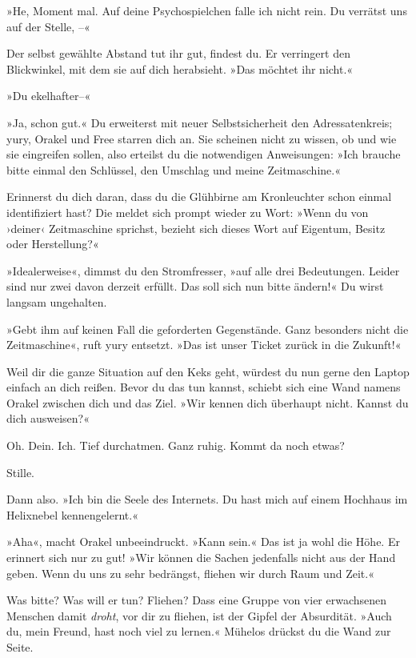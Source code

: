 »He, Moment mal. Auf deine Psychospielchen falle ich nicht rein. Du verrätst uns auf der Stelle, –«

Der selbst gewählte Abstand tut ihr gut, findest du. Er verringert den Blickwinkel, mit dem sie auf dich herabsieht. »Das möchtet ihr nicht.«

»Du ekelhafter–«

»Ja, schon gut.« Du erweiterst mit neuer Selbstsicherheit den Adressatenkreis; yury, Orakel und Free starren dich an. Sie scheinen nicht zu wissen, ob und wie sie eingreifen sollen, also erteilst du die notwendigen Anweisungen: »Ich brauche bitte einmal den Schlüssel, den Umschlag und meine Zeitmaschine.«

Erinnerst du dich daran, dass du die Glühbirne am Kronleuchter schon einmal identifiziert hast? Die meldet sich prompt wieder zu Wort: »Wenn du von ›deiner‹ Zeitmaschine sprichst, bezieht sich dieses Wort auf Eigentum, Besitz oder Herstellung?«

»Idealerweise«, dimmst du den Stromfresser, »auf alle drei Bedeutungen. Leider sind nur zwei davon derzeit erfüllt. Das soll sich nun bitte ändern!« Du wirst langsam ungehalten.

»Gebt ihm auf keinen Fall die geforderten Gegenstände. Ganz besonders nicht die Zeitmaschine«, ruft yury entsetzt. »Das ist unser Ticket zurück in die Zukunft!«

Weil dir die ganze Situation auf den Keks geht, würdest du nun gerne den Laptop einfach an dich reißen. Bevor du das tun kannst, schiebt sich eine Wand namens Orakel zwischen dich und das Ziel. »Wir kennen dich überhaupt nicht. Kannst du dich ausweisen?«

Oh. Dein. Ich. Tief durchatmen. Ganz ruhig. Kommt da noch etwas?

Stille.

Dann also. »Ich bin die Seele des Internets. Du hast mich auf einem Hochhaus im Helixnebel kennengelernt.« 

»Aha«, macht Orakel unbeeindruckt. »Kann sein.« Das ist ja wohl die Höhe. Er erinnert sich nur zu gut! »Wir können die Sachen jedenfalls nicht aus der Hand geben. Wenn du uns zu sehr bedrängst, fliehen wir durch Raum und Zeit.«

Was bitte? Was will er tun? Fliehen? Dass eine Gruppe von vier erwachsenen Menschen damit \emph{droht}, vor dir zu fliehen, ist der Gipfel der Absurdität. »Auch du, mein Freund, hast noch viel zu lernen.« Mühelos drückst du die Wand zur Seite.

